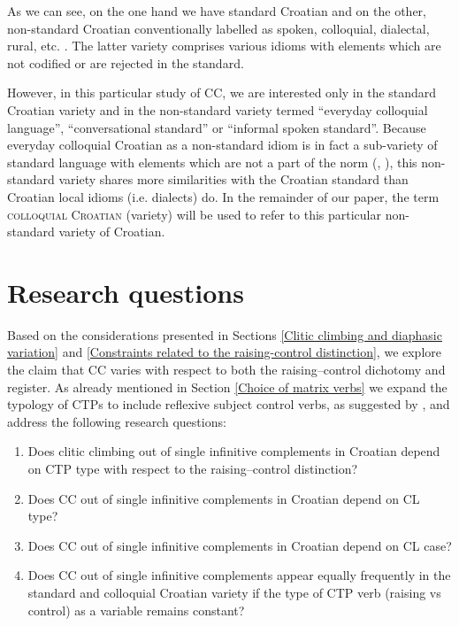 As we can see, on the one hand we have standard Croatian and on the other, non-standard Croatian conventionally labelled as spoken, colloquial, dialectal, rural, etc. \citep[cf.][32f]{Murelli11}. The latter variety comprises various idioms with elements which are not codified or are rejected in the standard. 

However, in this particular study of CC, we are interested only in the standard Croatian variety and in the non-standard variety termed “everyday colloquial language”, “conversational standard” or “informal spoken standard”. Because everyday colloquial Croatian as a non-standard idiom is in fact a sub-variety of standard language with elements which are not a part of the norm (\citealt[cf.][13--17]{Marle97}, \citealt[30]{LangstonPeti14}), this non-standard variety shares more similarities with the Croatian standard than Croatian local idioms (i.e. dialects) do. In the remainder of our paper, the term \textsc{colloquial} \textsc{Croatian} (variety) will be used to refer to this particular non-standard variety of Croatian. 

\section{Research questions}
\label{Research questions}
Based on the considerations presented in Sections \ref{Clitic climbing and diaphasic variation} and \ref{Constraints related to the raising-control distinction}, we explore the claim that CC varies with respect to both the raising--control dichotomy and register. As already mentioned in Section \ref{Choice of matrix verbs} we expand the typology of CTPs to include reflexive subject control verbs, as suggested by \citet*[266]{HKJ18}, and address the following research questions: 

\begin{enumerate}[label=Q\arabic*:]
\item Does clitic climbing out of single infinitive complements in Croatian depend on CTP type with respect to the raising--control distinction?
\item Does CC out of single infinitive complements in Croatian depend on CL type?
\item Does CC out of single infinitive complements in Croatian depend on CL case?
\item Does CC out of single infinitive complements appear equally frequently in the standard and colloquial Croatian variety if the type of CTP verb (raising vs control) as a variable remains constant? 
\end{enumerate}

